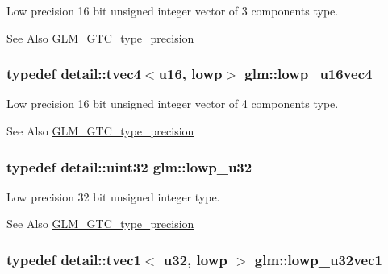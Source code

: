 Low precision 16 bit unsigned integer vector of 3 components type. \begin{DoxySeeAlso}{See Also}
\hyperlink{group__gtc__type__precision}{G\-L\-M\-\_\-\-G\-T\-C\-\_\-type\-\_\-precision} 
\end{DoxySeeAlso}
\hypertarget{group__gtc__type__precision_gab0210f390e7d75fa8eb42128a05ff23a}{
\subsubsection[{lowp\-\_\-u16vec4}]{\setlength{\rightskip}{0pt plus 5cm}typedef detail\-::tvec4$<$u16, lowp$>$ {\bf glm\-::lowp\-\_\-u16vec4}}}\label{group__gtc__type__precision_gab0210f390e7d75fa8eb42128a05ff23a}
Low precision 16 bit unsigned integer vector of 4 components type. \begin{DoxySeeAlso}{See Also}
\hyperlink{group__gtc__type__precision}{G\-L\-M\-\_\-\-G\-T\-C\-\_\-type\-\_\-precision} 
\end{DoxySeeAlso}
\hypertarget{group__gtc__type__precision_gaba06fae1dd98ca50c017e68345df0365}{
\subsubsection[{lowp\-\_\-u32}]{\setlength{\rightskip}{0pt plus 5cm}typedef detail\-::uint32 {\bf glm\-::lowp\-\_\-u32}}}\label{group__gtc__type__precision_gaba06fae1dd98ca50c017e68345df0365}
Low precision 32 bit unsigned integer type. \begin{DoxySeeAlso}{See Also}
\hyperlink{group__gtc__type__precision}{G\-L\-M\-\_\-\-G\-T\-C\-\_\-type\-\_\-precision} 
\end{DoxySeeAlso}
\hypertarget{group__gtc__type__precision_ga579d71c2ae1225b689aaab0bc7d33146}{
\subsubsection[{lowp\-\_\-u32vec1}]{\setlength{\rightskip}{0pt plus 5cm}typedef detail\-::tvec1$<$ u32, lowp $>$ {\bf glm\-::lowp\-\_\-u32vec1}}}\label{group__gtc__type__precision_ga579d71c2ae1225b689aaab0bc7d33146}
